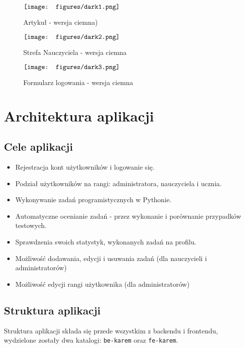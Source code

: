 \documentclass[shortabstract,inz]{iithesis}
\begin{document}
\begin{figure}[H]
	\centering
	$\vcenter{\hbox{\texttt{[image: figures/dark1.png]}}}$
    \caption[]{Artykuł - wersja ciemna)}
    \label{fig:dark1}
\end{figure}

\begin{figure}[H]
	\centering
	$\vcenter{\hbox{\texttt{[image: figures/dark2.png]}}}$
    \caption[]{Strefa Nauczyciela - wersja ciemna}
    \label{fig:dark2}
\end{figure}

\begin{figure}[H]
	\centering
	$\vcenter{\hbox{\texttt{[image: figures/dark3.png]}}}$
    \caption[]{Formularz logowania - wersja ciemna}
    \label{fig:dark3}
\end{figure}

\chapter{Architektura aplikacji}
\section{Cele aplikacji}
\begin{itemize}
    \item Rejestracja kont użytkowników i logowanie się.
    \item Podział użytkowników na rangi: administratora, nauczyciela i ucznia.
    \item Wykonywanie zadań programistycznych w Pythonie.
    \item Automatyczne ocenianie zadań - przez wykonanie i porównanie przypadków testowych.
    \item Sprawdzenia swoich statystyk, wykonanych zadań na profilu.
    \item Możliwość dodawania, edycji i usuwania zadań (dla nauczycieli i administratorów)
    \item Możliwość edycji rangi użytkownika (dla administratorów)
\end{itemize}

\section{Struktura aplikacji}

Struktura aplikacji składa się przede wszystkim z backendu i frontendu, wydzielone zostały dwa katalogi: \texttt{be-karem} oraz \texttt{fe-karem}. 
\end{document}
